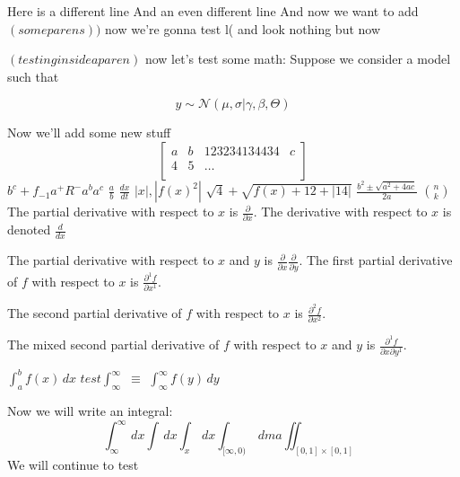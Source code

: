 \documentclass{article}
\newcommand{\abs}[1]{\left|#1\right|}
\newcommand{\dvOne}[1]{\frac{d}{d #1}}
\newcommand{\pdivOne}[1]{\frac{\partial}{\partial #1}}
\newcommand{\pdivN}[3]{\frac{\partial^{#3} #1}{\partial #2^{#3}}}
\begin{document}
    Here is a different line
    And an even different line
    And now we want to add $\left(some parens\right))$
    now we're gonna test l( and look nothing but now

    $ \left(testing inside a paren\right)$
    now let's test some math:
    Suppose we consider a model such that

    \begin{equation*}
        y \sim \mathcal{N}(\mu, \sigma \vert \gamma, \beta, \Theta)
    \end{equation*}


    Now we'll add some new stuff 
    \begin{equation*}
        \begin{bmatrix}
            a &    b & 123234134434 & c \\
            4   &    5     &     \dots \\
        \end{bmatrix}
    \end{equation*}
    $b^{c} + f_{-1} a^{+}  R^{-}  a^{b} a^{c}$
    $ \frac{a}{b}$
    $ \frac{dx}{dt}$
    $\abs{x}, \abs{f(x)^{2}}$
    $\sqrt{4} + \sqrt{f(x) + 12 + \abs{14}}$
    $\frac{b^{2} \pm \sqrt{a^{2} + 4ac}}{2a}$
    $\binom{n}{k}$
    The partial derivative with respect to \( x \) is \(\pdivOne{x}\).
    The derivative with respect to $x$ is denoted $\dvOne{x}$

The partial derivative with respect to \( x \) and \( y \) is \(\pdivOne{x} \pdivOne{y}\).
The first partial derivative of \( f \) with respect to \( x \) is \(\pdivN{f}{x}{1}\).

The second partial derivative of \( f \) with respect to \( x \) is \(\pdivN{f}{x}{2}\).

The mixed second partial derivative of \( f \) with respect to \( x \) and \( y \) is \(\pdivN{f}{x \partial y}{1}\).

 $\int_{a}^{b} f(x) \,dx$
 $test \int_{\infty}^{\infty}$
 $\equiv $
 $\int_{\infty}^{\infty} f(y) \,dy$


 Now we will write an integral:
 \begin{equation*}
     \int_{\infty}^{\infty}  \,dx
     \int  \,dx
     \int_{x}  \,dx
     \int_{[\infty, 0)}  \,dm \boxed{a}
     \iint_{[0,1] \times [0,1]}
 \end{equation*}                
 We will continue to test 
\end{document}
